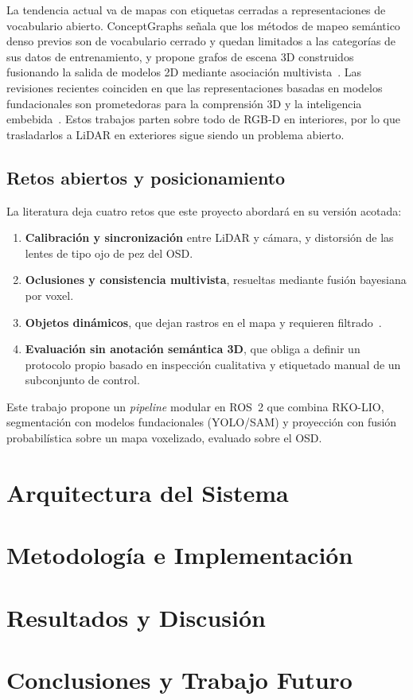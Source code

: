 \documentclass[11pt, twoside]{article}
\begin{document}
La tendencia actual va de mapas con etiquetas cerradas a representaciones de vocabulario abierto. ConceptGraphs señala que los métodos de mapeo semántico denso previos son de vocabulario cerrado y quedan limitados a las categorías de sus datos de entrenamiento, y propone grafos de escena 3D construidos fusionando la salida de modelos 2D mediante asociación multivista~\cite{gu2024conceptgraphs}. Las revisiones recientes coinciden en que las representaciones basadas en modelos fundacionales son prometedoras para la comprensión 3D y la inteligencia embebida~\cite{firoozi2023foundation,deng2025best3d}. Estos trabajos parten sobre todo de RGB-D en interiores, por lo que trasladarlos a LiDAR en exteriores sigue siendo un problema abierto.
 
\subsection{Retos abiertos y posicionamiento}
 
La literatura deja cuatro retos que este proyecto abordará en su versión acotada:
\begin{enumerate}
  \item \textbf{Calibración y sincronización} entre LiDAR y cámara, y distorsión de las lentes de tipo ojo de pez del OSD.
  \item \textbf{Oclusiones y consistencia multivista}, resueltas mediante fusión bayesiana por voxel.
  \item \textbf{Objetos dinámicos}, que dejan rastros en el mapa y requieren filtrado~\cite{jeong2018towards}.
  \item \textbf{Evaluación sin anotación semántica 3D}, que obliga a definir un protocolo propio basado en inspección cualitativa y etiquetado manual de un subconjunto de control.
\end{enumerate}
 
Este trabajo propone un \emph{pipeline} modular en ROS~2 que combina RKO-LIO, segmentación con modelos fundacionales (YOLO/SAM) y proyección con fusión probabilística sobre un mapa voxelizado, evaluado sobre el OSD.


\section{Arquitectura del Sistema}



\section{Metodología e Implementación}



\section{Resultados y Discusión}




\section{Conclusiones y Trabajo Futuro}



\nocite{*}

\end{document}
